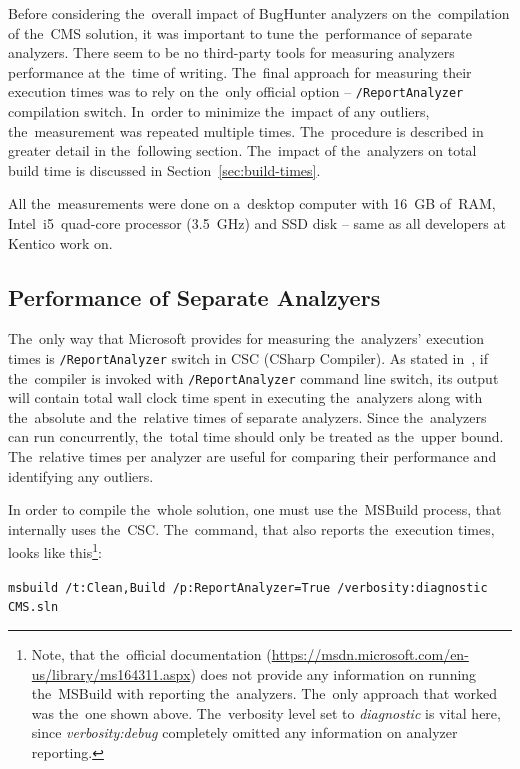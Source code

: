 \documentclass[
  digital, %
  table,   %
  lof,     %
  lot,     %
  oneside,
]{fithesis3}
\begin{document}
Before considering the~overall impact of BugHunter analyzers on the~compilation of the~CMS solution, it was important to tune the~performance of separate analyzers. There seem to be no third-party tools for measuring analyzers performance at the~time of writing. The~final approach for measuring their execution times was to rely on the~only official option -- \texttt{/ReportAnalyzer} compilation switch. In~order to minimize the~impact of any outliers, the~measurement was repeated multiple times. The~procedure is described in greater detail in the~following section. The~impact of the~analyzers on total build time is discussed in Section~\ref{sec:build-times}.

All the~measurements were done on a~desktop computer with 16~GB of~RAM, Intel~i5~quad-core processor (3.5~GHz) and SSD disk -- same as all developers at Kentico work on. 

\subsection{Performance of Separate Analzyers}
The~only way that Microsoft provides for measuring the~analyzers' execution times is \texttt{/ReportAnalyzer} switch in CSC (CSharp Compiler). As stated in~\cite{report-analyzer}, if the~compiler is invoked with \texttt{/ReportAnalyzer} command line switch, its output will contain total wall clock time spent in executing the~analyzers along with the~absolute and the~relative times of separate analyzers. Since the~analyzers can run concurrently, the~total time should only be treated as the~upper bound. The~relative times per analyzer are useful for comparing their performance and identifying any outliers.

In order to compile the~whole solution, one must use the~MSBuild process, that internally uses the~CSC.
The~command, that also reports the~execution times, looks like this\footnote{Note, that the~official documentation (\url{https://msdn.microsoft.com/en-us/library/ms164311.aspx}) does not provide any information on running the~MSBuild with reporting the~analyzers. The~only approach that worked was the~one shown above. The~verbosity level set to \textit{diagnostic} is vital here, since \textit{verbosity:debug} completely omitted any information on analyzer reporting.}:

\begin{center}
\texttt{msbuild /t:Clean,Build /p:ReportAnalyzer=True /verbosity:diagnostic CMS.sln}
\end{center}
\end{document}
